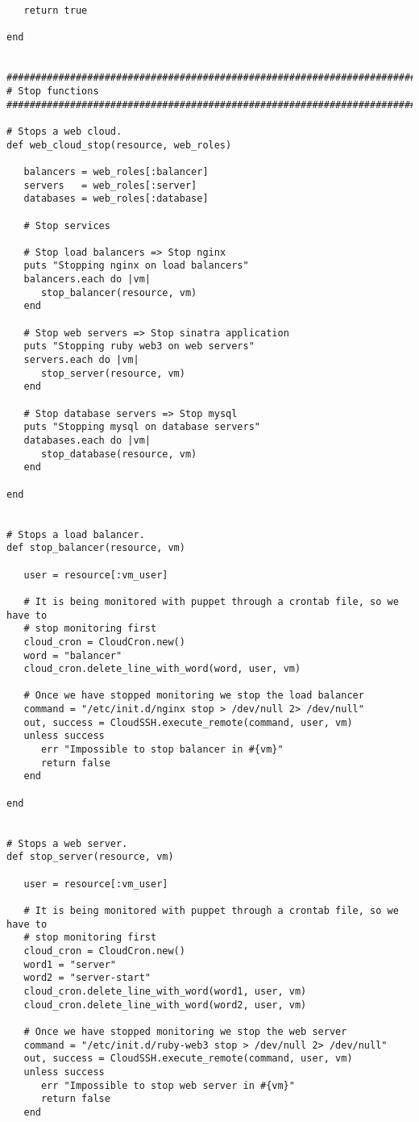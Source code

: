 \begin{lstlisting}
   return true

end


################################################################################
# Stop functions
################################################################################

# Stops a web cloud.
def web_cloud_stop(resource, web_roles)

   balancers = web_roles[:balancer]
   servers   = web_roles[:server]
   databases = web_roles[:database]

   # Stop services
   
   # Stop load balancers => Stop nginx
   puts "Stopping nginx on load balancers"
   balancers.each do |vm|
      stop_balancer(resource, vm)
   end
   
   # Stop web servers => Stop sinatra application
   puts "Stopping ruby web3 on web servers"
   servers.each do |vm|
      stop_server(resource, vm)
   end
   
   # Stop database servers => Stop mysql
   puts "Stopping mysql on database servers"
   databases.each do |vm|
      stop_database(resource, vm)
   end

end


# Stops a load balancer.
def stop_balancer(resource, vm)

   user = resource[:vm_user]

   # It is being monitored with puppet through a crontab file, so we have to
   # stop monitoring first
   cloud_cron = CloudCron.new()
   word = "balancer"
   cloud_cron.delete_line_with_word(word, user, vm)
   
   # Once we have stopped monitoring we stop the load balancer
   command = "/etc/init.d/nginx stop > /dev/null 2> /dev/null"
   out, success = CloudSSH.execute_remote(command, user, vm)
   unless success
      err "Impossible to stop balancer in #{vm}"
      return false
   end

end


# Stops a web server.
def stop_server(resource, vm)

   user = resource[:vm_user]

   # It is being monitored with puppet through a crontab file, so we have to
   # stop monitoring first
   cloud_cron = CloudCron.new()
   word1 = "server"
   word2 = "server-start"
   cloud_cron.delete_line_with_word(word1, user, vm)
   cloud_cron.delete_line_with_word(word2, user, vm)
   
   # Once we have stopped monitoring we stop the web server
   command = "/etc/init.d/ruby-web3 stop > /dev/null 2> /dev/null"
   out, success = CloudSSH.execute_remote(command, user, vm)
   unless success
      err "Impossible to stop web server in #{vm}"
      return false
   end
   

\end{lstlisting}
